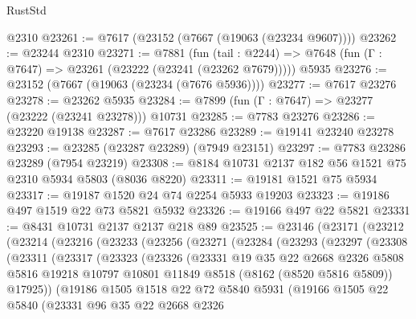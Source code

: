 \begin{lexlean}{RustStd}
\begin{coremodule}
    @2310
@23261 := @7617 (@23152 (@7667 (@19063 (@23234 @9607))))
@23262 := @23244 @2310
@23271 := @7881
    (fun (tail : @2244) => @7648 (fun (Γ : @7647) => @23261 (@23222 (@23241 (@23262 @7679)))))
    @5935
@23276 := @23152 (@7667 (@19063 (@23234 (@7676 @5936))))
@23277 := @7617 @23276
@23278 := @23262 @5935
@23284 := @7899 (fun (Γ : @7647) => @23277 (@23222 (@23241 @23278))) @10731
@23285 := @7783 @23276
@23286 := @23220 @19138
@23287 := @7617 @23286
@23289 := @19141 @23240 @23278
@23293 := @23285 (@23287 @23289) (@7949 @23151)
@23297 := @7783 @23286 @23289 (@7954 @23219)
@23308 := @8184 @10731 @2137 @182 @56 @1521 @75 @2310 @5934 @5803 (@8036 @8220)
@23311 := @19181 @1521 @75 @5934
@23317 := @19187 @1520 @24 @74 @2254 @5933 @19203
@23323 := @19186 @497 @1519 @22 @73 @5821 @5932
@23326 := @19166 @497 @22 @5821
@23331 := @8431 @10731 @2137 @2137 @218 @89
@23525 := @23146
    (@23171
      (@23212
        (@23214
          (@23216
            (@23233
              (@23256
                (@23271
                  (@23284
                    (@23293
                      (@23297
                        (@23308
                          (@23311
                            (@23317
                              (@23323
                                (@23326
                                  (@23331
                                    @19
                                    @35
                                    @22
                                    @2668
                                    @2326
                                    @5808
                                    @5816
                                    @19218
                                    @10797
                                    @10801
                                    @11849
                                    @8518
                                    (@8162 (@8520 @5816 @5809))
                                    @17925))
                                (@19186
                                  @1505
                                  @1518
                                  @22
                                  @72
                                  @5840
                                  @5931
                                  (@19166
                                    @1505
                                    @22
                                    @5840
                                    (@23331
                                      @96
                                      @35
                                      @22
                                      @2668
                                      @2326

\end{coremodule}
\end{lexlean}
